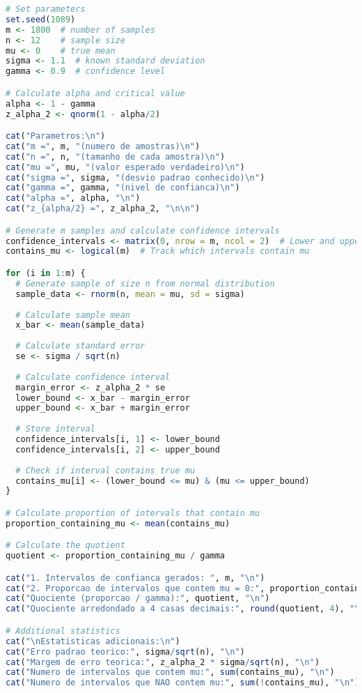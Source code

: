 \documentclass[11pt,a4paper]{article}
\begin{document}
\begin{lstlisting}[language=R]
# Set parameters
set.seed(1089)
m <- 1800  # number of samples
n <- 12    # sample size
mu <- 0    # true mean
sigma <- 1.1  # known standard deviation
gamma <- 0.9  # confidence level

# Calculate alpha and critical value
alpha <- 1 - gamma
z_alpha_2 <- qnorm(1 - alpha/2)

cat("Parametros:\n")
cat("m =", m, "(numero de amostras)\n")
cat("n =", n, "(tamanho de cada amostra)\n")
cat("mu =", mu, "(valor esperado verdadeiro)\n")
cat("sigma =", sigma, "(desvio padrao conhecido)\n")
cat("gamma =", gamma, "(nivel de confianca)\n")
cat("alpha =", alpha, "\n")
cat("z_{alpha/2} =", z_alpha_2, "\n\n")

# Generate m samples and calculate confidence intervals
confidence_intervals <- matrix(0, nrow = m, ncol = 2)  # Lower and upper bounds
contains_mu <- logical(m)  # Track which intervals contain mu

for (i in 1:m) {
  # Generate sample of size n from normal distribution
  sample_data <- rnorm(n, mean = mu, sd = sigma)
  
  # Calculate sample mean
  x_bar <- mean(sample_data)
  
  # Calculate standard error
  se <- sigma / sqrt(n)
  
  # Calculate confidence interval
  margin_error <- z_alpha_2 * se
  lower_bound <- x_bar - margin_error
  upper_bound <- x_bar + margin_error
  
  # Store interval
  confidence_intervals[i, 1] <- lower_bound
  confidence_intervals[i, 2] <- upper_bound
  
  # Check if interval contains true mu
  contains_mu[i] <- (lower_bound <= mu) & (mu <= upper_bound)
}

# Calculate proportion of intervals that contain mu
proportion_containing_mu <- mean(contains_mu)

# Calculate the quotient
quotient <- proportion_containing_mu / gamma

cat("1. Intervalos de confianca gerados: ", m, "\n")
cat("2. Proporcao de intervalos que contem mu = 0:", proportion_containing_mu, "\n")
cat("Quociente (proporcao / gamma):", quotient, "\n")
cat("Quociente arredondado a 4 casas decimais:", round(quotient, 4), "\n")

# Additional statistics
cat("\nEstatisticas adicionais:\n")
cat("Erro padrao teorico:", sigma/sqrt(n), "\n")
cat("Margem de erro teorica:", z_alpha_2 * sigma/sqrt(n), "\n")
cat("Numero de intervalos que contem mu:", sum(contains_mu), "\n")
cat("Numero de intervalos que NAO contem mu:", sum(!contains_mu), "\n")
\end{lstlisting}
\end{document}
